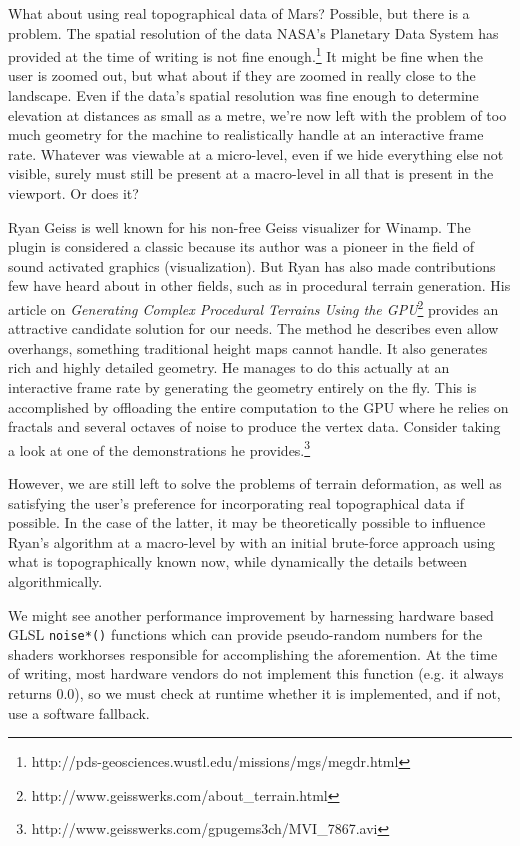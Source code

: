 What about using real topographical data of Mars? Possible, but there is a problem. The spatial resolution of the data NASA's Planetary Data System has provided at the time of writing is not fine enough.\footnote{http://pds-geosciences.wustl.edu/missions/mgs/megdr.html} It might be fine when the user is zoomed out, but what about if they are zoomed in really close to the landscape. Even if the data's spatial resolution was fine enough to determine elevation at distances as small as a metre, we're now left with the problem of too much geometry for the machine to realistically handle at an interactive frame rate. Whatever was viewable at a micro-level, even if we hide everything else not visible, surely must still be present at a macro-level in all that is present in the viewport. Or does it?

Ryan Geiss is well known for his non-free Geiss visualizer for Winamp. The plugin is considered a classic because its author was a pioneer in the field of sound activated graphics (visualization). But Ryan has also made contributions few have heard about in other fields, such as in procedural terrain generation. His article on {\it Generating Complex Procedural Terrains Using the GPU}\footnote{http://www.geisswerks.com/about_terrain.html} provides an attractive candidate solution for our needs. The method he describes even allow overhangs, something traditional height maps cannot handle. It also generates rich and highly detailed geometry. He manages to do this actually at an interactive frame rate by generating the geometry entirely on the fly. This is accomplished by offloading the entire computation to the GPU where he relies on fractals and several octaves of noise to produce the vertex data. Consider taking a look at one of the demonstrations he provides.\footnote{http://www.geisswerks.com/gpugems3ch/MVI_7867.avi}

However, we are still left to solve the problems of terrain deformation, as well as satisfying the user's preference for incorporating real topographical data if possible. In the case of the latter, it may be theoretically possible to influence Ryan's algorithm at a macro-level by  with an initial brute-force approach using what is topographically known now, while dynamically  the details between algorithmically.

We might see another performance improvement by harnessing hardware based GLSL {\tt noise*()} functions which can provide pseudo-random numbers for the shaders workhorses responsible for accomplishing the aforemention. At the time of writing, most hardware vendors do not implement this function (e.g. it always returns 0.0), so we must check at runtime whether it is implemented, and if not, use a software fallback.

